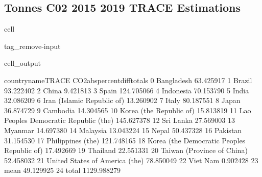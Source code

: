 \documentclass[letterpaper,10pt,english]{jupyterBook}
\begin{document}
\subsection{Tonnes C02 2015 \sphinxhyphen{} 2019 TRACE Estimations}
\label{\detokenize{notebooks/hidden_post:tonnes-c02-2015-2019-trace-estimations}}
\begin{sphinxuseclass}{cell}
\begin{sphinxuseclass}{tag_remove-input}\begin{sphinxVerbatimOutput}

\begin{sphinxuseclass}{cell_output}
\begin{sphinxVerbatim}[commandchars=\\\{\}]
                             country\PYGZus{}name\PYGZus{}TRACE  CO2\PYGZus{}abs\PYGZus{}percent\PYGZus{}diff\PYGZus{}totals  \PYGZbs{}
0                                    Bangladesh                    63.425917   
1                                        Brazil                    93.222402   
2                                         China                     9.421813   
3                                         Spain                   124.705066   
4                                     Indonesia                    70.153790   
5                                         India                    32.086209   
6                    Iran (Islamic Republic of)                    13.260902   
7                                         Italy                    80.187551   
8                                         Japan                    36.874729   
9                                      Cambodia                    14.304565   
10                      Korea (the Republic of)                    15.813819   
11       Lao People\PYGZsq{}s Democratic Republic (the)                   145.627378   
12                                    Sri Lanka                    27.569003   
13                                      Myanmar                    14.697380   
14                                     Malaysia                    13.043224   
15                                        Nepal                    50.437328   
16                                     Pakistan                    31.154530   
17                            Philippines (the)                   121.748165   
18  Korea (the Democratic People\PYGZsq{}s Republic of)                    17.492669   
19                                     Thailand                    22.551331   
20                   Taiwan (Province of China)                    52.458032   
21               United States of America (the)                    78.850049   
22                                     Viet Nam                     0.902428   
23                                         mean                    49.129925   
24                                        total                  1129.988279   


\end{sphinxVerbatim}
\end{sphinxuseclass}
\end{sphinxVerbatimOutput}
\end{sphinxuseclass}
\end{sphinxuseclass}
\end{document}
